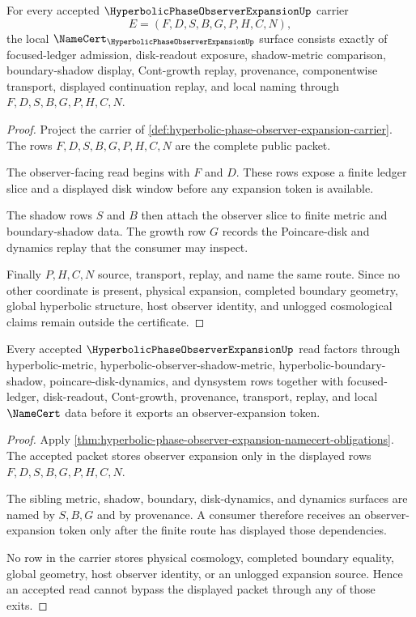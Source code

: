 \begin{theorem}
\label{thm:hyperbolic-phase-observer-expansion-namecert-obligations}
For every accepted $\HyperbolicPhaseObserverExpansionUp$ carrier
$$
E=(F,D,S,B,G,P,H,C,N),
$$
the local $\NameCert_{\HyperbolicPhaseObserverExpansionUp}$ surface consists exactly of focused-ledger admission, disk-readout exposure, shadow-metric comparison, boundary-shadow display, Cont-growth replay, provenance, componentwise transport, displayed continuation replay, and local naming through $F,D,S,B,G,P,H,C,N$.
\end{theorem}
\begin{proof}
Project the carrier of \autoref{def:hyperbolic-phase-observer-expansion-carrier}. The rows $F,D,S,B,G,P,H,C,N$ are the complete public packet.

The observer-facing read begins with $F$ and $D$. These rows expose a finite ledger slice and a displayed disk window before any expansion token is available.

The shadow rows $S$ and $B$ then attach the observer slice to finite metric and boundary-shadow data. The growth row $G$ records the Poincare-disk and dynamics replay that the consumer may inspect.

Finally $P,H,C,N$ source, transport, replay, and name the same route. Since no other coordinate is present, physical expansion, completed boundary geometry, global hyperbolic structure, host observer identity, and unlogged cosmological claims remain outside the certificate.
\end{proof}

\begin{theorem}
\label{thm:hyperbolic-phase-observer-expansion-nonescape}
Every accepted $\HyperbolicPhaseObserverExpansionUp$ read factors through hyperbolic-metric, hyperbolic-observer-shadow-metric, hyperbolic-boundary-shadow, poincare-disk-dynamics, and dynsystem rows together with focused-ledger, disk-readout, Cont-growth, provenance, transport, replay, and local $\NameCert$ data before it exports an observer-expansion token.
\end{theorem}
\begin{proof}
Apply \autoref{thm:hyperbolic-phase-observer-expansion-namecert-obligations}. The accepted packet stores observer expansion only in the displayed rows $F,D,S,B,G,P,H,C,N$.

The sibling metric, shadow, boundary, disk-dynamics, and dynamics surfaces are named by $S,B,G$ and by provenance. A consumer therefore receives an observer-expansion token only after the finite route has displayed those dependencies.

No row in the carrier stores physical cosmology, completed boundary equality, global geometry, host observer identity, or an unlogged expansion source. Hence an accepted read cannot bypass the displayed packet through any of those exits.
\end{proof}

